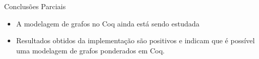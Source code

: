 \begin{frame}{Conclusões Parciais}
    \begin{itemize}
        \item A modelagem de grafos no Coq ainda está sendo estudada
        \item Resultados obtidos da implementação são positivos e indicam que é possível uma modelagem de grafos ponderados em Coq.
    \end{itemize}
\end{frame}